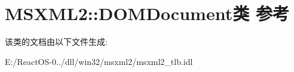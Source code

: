 \hypertarget{class_m_s_x_m_l2_1_1_d_o_m_document}{}\section{M\+S\+X\+M\+L2\+:\+:D\+O\+M\+Document类 参考}
\label{class_m_s_x_m_l2_1_1_d_o_m_document}


该类的文档由以下文件生成\+:\begin{DoxyCompactItemize}
\item 
E\+:/\+React\+O\+S-\/0../dll/win32/msxml2/msxml2\+\_\+tlb.\+idl\end{DoxyCompactItemize}
